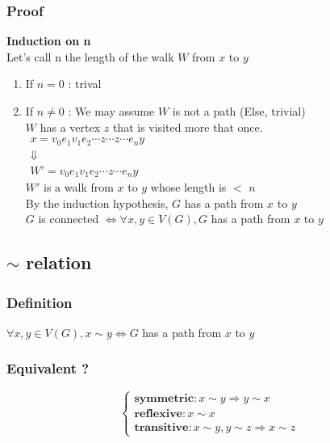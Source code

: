         \subsubsection{Proof}
            \textbf{Induction on n}\\
            Let's call n the length of the walk $W$ from $x$ to $y$

            \begin{enumerate}
                \item If $n = 0$ : trival
                \item If $n \neq 0$ :
                    We may assume $W$ is not a path (Else, trivial)\\
                    $W$ has a vertex $z$ that is visited more that once.\\
                    $\begin{array}{c}
                        x=v_0 e_1 v_1 e_2 \cdots z \cdots z \cdots e_n y \\
                        \Downarrow\\
                        W'=v_0 e_1 v_1 e_2 \cdots z \cdots e_n y
                    \end{array}$\\
                    $W'$ is a walk from $x$ to $y$ whose length is $<$ $n$\\
                    By the induction hypothesis, $G$ has a path from $x$ to $y$\\
                    $G$ is connected $\Leftrightarrow \forall x, y \in V(G), G$ has a path from $x$ to $y$
            \end{enumerate}
            

    \subsection{$\sim$ relation}
        \subsubsection{Definition}
            $\forall x,y \in V(G), x \sim y \Leftrightarrow G$ has a path from $x$ to $y$
        \subsubsection{Equivalent ?}
        \[ \left \{
            \begin{array}{l}
                \textbf{symmetric}: x\sim y \Rightarrow  y\sim x\\
                \textbf{reflexive}: x\sim x\\
                \textbf{transitive}: x\sim y, y\sim z \Rightarrow x\sim z
            \end{array}
        \right .\]
